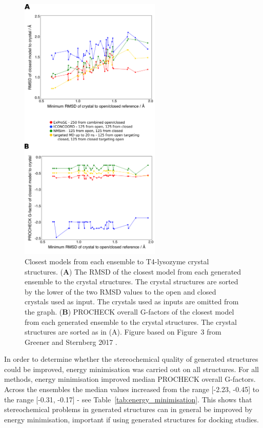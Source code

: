 \begin{figure}
\centering

\includegraphics[width=0.6\textwidth]{figures/t4l_rmsd/t4l_rmsd}

\caption{Closest models from each ensemble to T4-lysozyme crystal structures.
(\textbf{A}) The RMSD of the closest model from each generated ensemble to the crystal structures.
The crystal structures are sorted by the lower of the two RMSD values to the open and closed crystals used as input.
The crystals used as inputs are omitted from the graph.
(\textbf{B}) PROCHECK overall G-factors of the closest model from each generated ensemble to the crystal structures.
The crystal structures are sorted as in (A).
Figure based on Figure~3 from Greener and Sternberg 2017 \cite{Greener2017}.}

\label{fig:t4l_rmsd}
\end{figure}


In order to determine whether the stereochemical quality of generated structures could be improved, energy minimisation was carried out on all structures.
For all methods, energy minimisation improved median PROCHECK overall G-factors.
Across the ensembles the median values increased from the range [-2.23, -0.45] to the range [-0.31, -0.17] - see Table~\ref{tab:energy_minimisation}.
This shows that stereochemical problems in generated structures can in general be improved by energy minimisation, important if using generated structures for docking studies.

